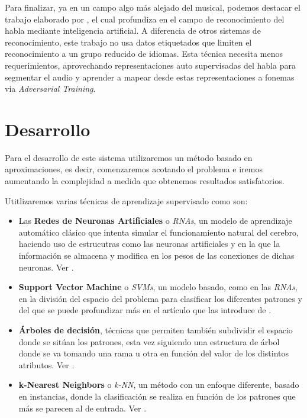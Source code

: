 \documentclass[12pt]{article}
\begin{document}
\bigskip
Para finalizar, ya en un campo algo más alejado del musical, podemos destacar el trabajo elaborado por \cite{baevski2021unsupervised},
el cual profundiza en el campo de reconocimiento del habla mediante inteligencia artificial.
A diferencia de otros sistemas de reconocimiento, este trabajo no usa datos etiquetados que limiten el reconocimiento a un grupo reducido de idiomas. 
Esta técnica necesita menos requerimientos, aprovechando representaciones auto supervisadas del habla para segmentar el audio y aprender a 
mapear desde estas representaciones a fonemas via \textit{Adversarial Training}.

\bigskip

\newpage
\section{Desarrollo}
\label{Desarrollo}
Para el desarrollo de este sistema utilizaremos un método basado en aproximaciones, es decir, comenzaremos acotando el problema e iremos aumentando
la complejidad a medida que obtenemos resultados satisfatorios.

\bigskip
Utitlizaremos varias técnicas de aprendizaje supervisado como son:
\begin{itemize}
	\item Las \textbf{Redes de Neuronas Artificiales} o \textit{RNAs}, un modelo de aprendizaje automático clásico que
	intenta simular el funcionamiento natural del cerebro, haciendo uso de estrucutras como las neuronas artificiales y en la que
	la información se almacena y modifica en los pesos de las conexiones de dichas neuronas. Ver \cite{krogh2008artificial}.
	\item \textbf{Support Vector Machine} o \textit{SVMs}, un modelo basado, como en las \textit{RNAs}, en la división del espacio del problema para clasificar
	los diferentes patrones y del que se puede profundizar más en el artículo que las introduce de \cite{cortes1995support}.
	\item \textbf{Árboles de decisión}, técnicas que permiten también subdividir el espacio donde se sitúan los patrones, esta vez
	siguiendo una estructura de árbol donde se va tomando una rama u otra en función del valor de los distintos atributos. Ver \cite{myles2004introduction}.
	\item \textbf{ k-Nearest Neighbors} o \textit{k-NN}, un método con un enfoque diferente, basado en instancias, donde la clasificación
	se realiza en función de los patrones que más se parecen al de entrada. Ver \cite{guo2003knn}.
\end{itemize}
\end{document}
